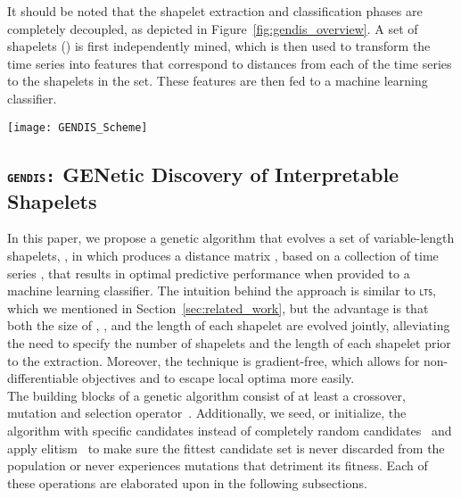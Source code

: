 \documentclass[runningheads]{llncs}
\begin{document}
It should be noted that the shapelet extraction and classification phases are completely decoupled, as depicted in Figure~\ref{fig:gendis_overview}. A set of shapelets () is first independently mined, which is then used to transform the time series into features that correspond to distances from each of the time series to the shapelets in the set. These features are then fed to a machine learning classifier.



\begin{figure*}
	\centering
	\texttt{[image: GENDIS\_Scheme]}
	\caption{A schematic overview of shapelet discovery. First, shapelets are independently extracted using the training set. These shapelets are then used to transform the train and test set in features. A classifier can afterwards be fit on the training features and evaluated on the test features.}
	\label{fig:gendis_overview}      
\end{figure*}

\subsection{\textsc{\texttt{gendis:}} GENetic Discovery of Interpretable Shapelets} \label{subsec:genetic}

In this paper, we propose a genetic algorithm that evolves a set of variable-length shapelets, , in  which produces a distance matrix , based on a collection of time series , that results in optimal predictive performance when provided to a machine learning classifier. The intuition behind the approach is similar to \textsc{\texttt{lts}}, which we mentioned in Section~\ref{sec:related_work}, but the advantage is that both the size of , , and the length of each shapelet  are evolved jointly, alleviating the need to specify the number of shapelets and the length of each shapelet prior to the extraction. Moreover, the technique is gradient-free, which allows for non-differentiable objectives and to escape local optima more easily. \\

The building blocks of a genetic algorithm consist of at least a crossover, mutation and selection operator~\citep{mitchell1998introduction}. Additionally, we seed, or initialize, the algorithm with specific candidates instead of completely random candidates~\citep{julstrom1994seeding} and apply elitism~\citep{sheble1995refined} to make sure the fittest candidate set is never discarded from the population or never experiences mutations that detriment its fitness. Each of these operations are elaborated upon in the following subsections.
\end{document}
